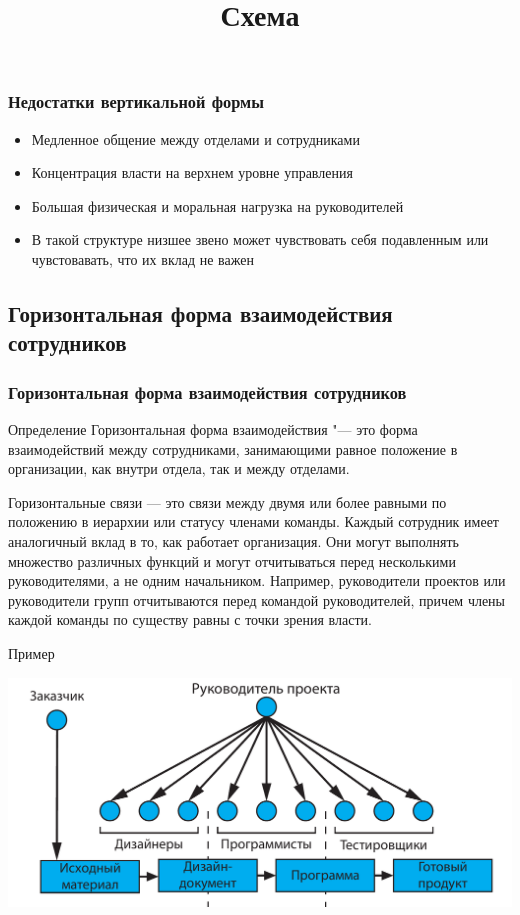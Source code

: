 \documentclass{../industrial-development}
\begin{document}
\begin{frame} \frametitle{Недостатки вертикальной формы}
  
  \begin{itemize}
  \item Медленное общение между отделами и сотрудниками
  \item Концентрация власти на верхнем уровне управления
  \item Большая физическая и моральная нагрузка на руководителей
  \item В такой структуре низшее звено может чувствовать себя подавленным или чувстовавать, что их вклад не важен
  \end{itemize}
\end{frame}

\subsection{Горизонтальная форма взаимодействия сотрудников}

\begin{} \frametitle{Горизонтальная форма взаимодействия сотрудников}
  \begin{block}{Определение}
Горизонтальная форма взаимодействия "--- это форма взаимодействий между сотрудниками, занимающими равное положение в организации, как внутри отдела, так и между отделами.
  \end{block}
\end{}

\lecturenotes
Горизонтальные связи — это связи между двумя или более равными по положению в иерархии или статусу членами команды. Каждый сотрудник имеет аналогичный вклад в то, как работает организация. Они могут выполнять множество различных функций и могут отчитываться перед несколькими руководителями, а не одним начальником. Например, руководители проектов или руководители групп отчитываются перед командой руководителей, причем члены каждой команды по существу равны с точки зрения власти.

\begin{} \title{Схема}
  \begin{block}{Пример}
\centerline{\includegraphics[width=1\textwidth]{horizontal.pdf}}
  \end{block}
\end{}
\end{document}
